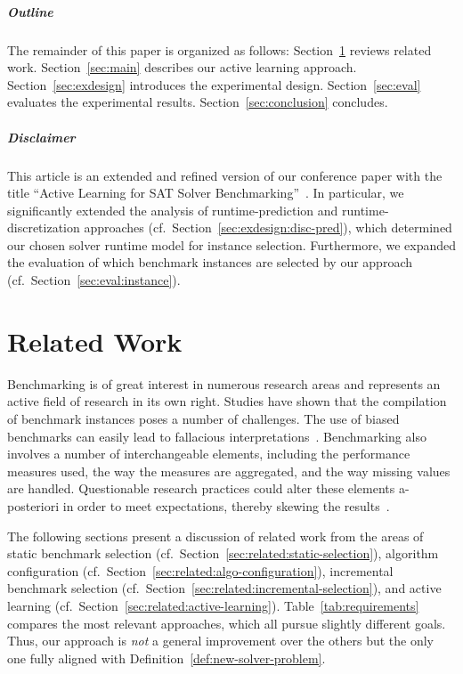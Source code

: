 \documentclass[sn-basic, Numbered]{sn-jnl} %
\begin{document}
\subparagraph{Outline}

The remainder of this paper is organized as follows:
Section~\ref{sec:related} reviews related work.
Section~\ref{sec:main} describes our active learning approach.
Section~\ref{sec:exdesign} introduces the experimental design.
Section~\ref{sec:eval} evaluates the experimental results.
Section~\ref{sec:conclusion} concludes.

\subparagraph{Disclaimer}

This article is an extended and refined version of our conference paper with the title ``Active Learning for SAT Solver Benchmarking''~\cite{fuchs2023active}.
In particular, we significantly extended the analysis of runtime-prediction and runtime-discretization approaches (cf.~Section~\ref{sec:exdesign:disc-pred}), which determined our chosen solver runtime model for instance selection.
Furthermore, we expanded the evaluation of which benchmark instances are selected by our approach (cf.~Section~\ref{sec:eval:instance}).

\section{Related Work}
\label{sec:related}

Benchmarking is of great interest in numerous research areas and represents an active field of research in its own right.
Studies have shown that the compilation of benchmark instances poses a number of challenges.
The use of biased benchmarks can easily lead to fallacious interpretations~\cite{abs-2107-07002}.
Benchmarking also involves a number of interchangeable elements, including the performance measures used, the way the measures are aggregated, and the way missing values are handled.
Questionable research practices could alter these elements a-posteriori in order to meet expectations, thereby skewing the results~\cite{NiesslHWCB22}.

The following sections present a discussion of related work from the areas of static benchmark selection (cf.~Section~\ref{sec:related:static-selection}), algorithm configuration (cf.~Section~\ref{sec:related:algo-configuration}), incremental benchmark selection (cf.~Section~\ref{sec:related:incremental-selection}), and active learning (cf.~Section~\ref{sec:related:active-learning}).
Table~\ref{tab:requirements} compares the most relevant approaches, which all pursue slightly different goals.
Thus, our approach is \emph{not} a general improvement over the others but the only one fully aligned with Definition~\ref{def:new-solver-problem}.
\end{document}
